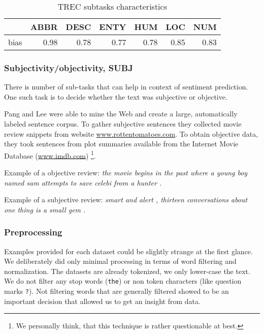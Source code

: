 \begin{table}[h]
\begin{center}

\begin{tabular}{lrrrrrr}
\toprule
{} &  ABBR &  DESC &  ENTY &   HUM &   LOC &   NUM \\
\midrule
bias &  0.98 &  0.78 &  0.77 &  0.78 &  0.85 &  0.83 \\
\bottomrule
\end{tabular}

\caption[TREC subtasks characteristics]{TREC subtasks characteristics}
\label{tab:trec:stats}
\end{center}
\end{table}

    \subsubsection{Subjectivity/objectivity, SUBJ}
    
    There is number of sub-tasks that can help in context of sentiment prediction.
    One such task is to decide whether the text was subjective or objective.
        
    Pang and Lee were able to mine the Web and create a large, automatically labeled sentence corpus. 
    To gather subjective sentences they collected movie review snippets from website  \url{www.rottentomatoes.com}.
    To obtain objective data, they took sentences from plot summaries available from the Internet Movie Database (\url{www.imdb.com}) \cite{pang2004sentimental} \footnote{We personally think, that this technique is rather questionable at best.}.
    
    Example of a objective review:
    \emph{the movie begins in the past where a young boy named sam attempts to save celebi from a hunter .}

    Example of a subjective review:
    \emph{smart and alert , thirteen conversations about one thing is a small gem .}
    

    \subsubsection{Preprocessing} \label{sec:preprocessing}
    
    Examples provided for each dataset could be slightly strange at the first glance.
    We deliberately did only minimal processing in terms of word filtering and normalization.
    The datasets are already tokenized, we only lower-case the text.
    We do not filter any stop words (\texttt{the}) or non token characters (like question marks \texttt{?}). 
    Not filtering words that are generally filtered showed to be an important decision that allowed us to get an insight from data.
    
